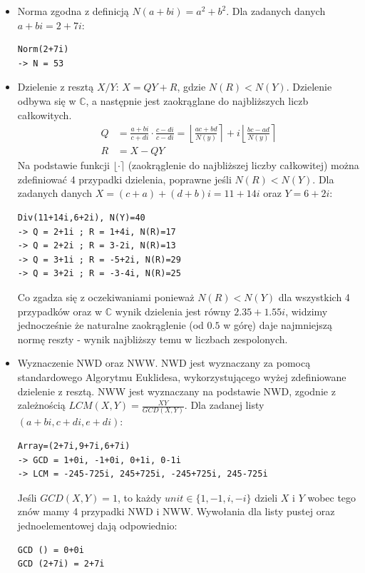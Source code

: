 \documentclass[12pt, a4paper]{article}
\begin{document}
\begin{itemize}
    \item Norma zgodna z definicją $N(a+bi) = a^2 + b^2$. Dla zadanych danych $a+bi = 2+7i$:
    \begin{verbatim}
Norm(2+7i)
-> N = 53
    \end{verbatim}
    \item Dzielenie z resztą $X/Y$: $X=QY+R$, gdzie $N(R) < N(Y)$. Dzielenie odbywa się w $\mathbb{C}$, a następnie jest zaokrąglane do najbliższych liczb całkowitych.
    \begin{align*}
        Q &= \frac{a+bi}{c+di} \cdot \frac{c-di}{c-di} = \left\lfloor \frac{ac+bd}{N(y)} \right\rceil + i \left\lfloor \frac{bc-ad}{N(y)} \right\rceil\\
        R &= X - QY
    \end{align*}
    Na podstawie funkcji $\lfloor \cdot \rceil$ (zaokrąglenie do najbliższej liczby całkowitej)
    można zdefiniować 4 przypadki dzielenia, poprawne jeśli $N(R) < N(Y)$.
    Dla zadanych danych $X = (c+a) + (d+b)i = 11 + 14i$ oraz $Y = 6 + 2i$:
    \begin{verbatim}
Div(11+14i,6+2i), N(Y)=40
-> Q = 2+1i ; R = 1+4i, N(R)=17
-> Q = 2+2i ; R = 3-2i, N(R)=13
-> Q = 3+1i ; R = -5+2i, N(R)=29
-> Q = 3+2i ; R = -3-4i, N(R)=25
    \end{verbatim}
    Co zgadza się z oczekiwaniami ponieważ $N(R) < N(Y)$ dla wszystkich 4 przypadków oraz w $\mathbb{C}$ wynik dzielenia jest równy $2.35 + 1.55i$,
    widzimy jednocześnie że naturalne zaokrąglenie (od $0.5$ w górę) daje najmniejszą normę reszty - wynik najbliższy temu w liczbach zespolonych.
    \item Wyznaczenie NWD oraz NWW. NWD jest wyznaczany za pomocą standardowego Algorytmu Euklidesa, wykorzystującego wyżej zdefiniowane dzielenie z resztą.
    NWW jest wyznaczany na podstawie NWD, zgodnie z zależnością $LCM(X,Y) = \frac{XY}{GCD(X,Y)}$. Dla zadanej listy $(a+bi,c+di,e+di)$:
    \begin{verbatim}
Array=(2+7i,9+7i,6+7i)
-> GCD = 1+0i, -1+0i, 0+1i, 0-1i
-> LCM = -245-725i, 245+725i, -245+725i, 245-725i
    \end{verbatim}
    Jeśli $GCD(X,Y) = 1$, to każdy $ \textit{unit} \in\{1,-1,i,-i\}$ dzieli $X$ i $Y$ wobec tego znów mamy 4 przypadki NWD i NWW.
    Wywołania dla listy pustej oraz jednoelementowej dają odpowiednio:
    \begin{verbatim}
GCD () = 0+0i
GCD (2+7i) = 2+7i
    \end{verbatim}
\end{itemize}
\end{document}
